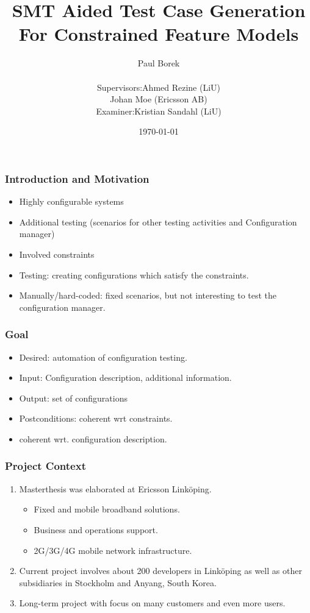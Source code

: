 \documentclass[swedish]{beamer}
\title[Configuration Testing]{SMT Aided Test Case Generation For Constrained Feature Models}
\institute[LiU]{Link\"opings University, Ericsson AB}
\date{\today}
\begin{document}
\author[Paul Borek]{Paul Borek\\\vspace{1em}\begin{tabular}{r@{ }l}
Supervisors: & Ahmed Rezine (LiU) \\
	         & Johan Moe (Ericsson AB)\\
Examiner: & Kristian Sandahl (LiU)
\end{tabular}}

 \begin{frame}
  \titlepage
 \end{frame}
 
 \begin{frame}
  \frametitle{Introduction and Motivation}
  \begin{itemize}
   \item Highly configurable systems
   \item Additional testing (scenarios for other testing activities and Configuration manager)
   \item Involved constraints
   \item Testing: creating configurations which satisfy the constraints.
   \item Manually/hard-coded: fixed scenarios, but not interesting to test the configuration manager.
  \end{itemize}
 \end{frame}
 
 \begin{frame}
  \frametitle{Goal}
  \begin{itemize}
   \item Desired: automation of configuration testing.
   \item Input: Configuration description, additional information.
   \item Output: set of configurations
   \item Postconditions: coherent wrt constraints.
   \item coherent wrt. configuration description.
  \end{itemize}
 \end{frame}

 \begin{frame}
  \frametitle{Project Context}
  \begin{enumerate}
   \item Masterthesis was elaborated at Ericsson Link\"oping.
   \begin{itemize}
    \item Fixed and mobile broadband solutions.
    \item Business and operations support.
    \item 2G/3G/4G mobile network infrastructure.
   \end{itemize}
   
   \item Current project involves about 200 developers in Link\"oping as well as other subsidiaries in Stockholm and Anyang, South Korea.
   
   \item Long-term project with focus on many customers and even more users. 
  \end{enumerate}
 \end{frame}
 
\end{document}
